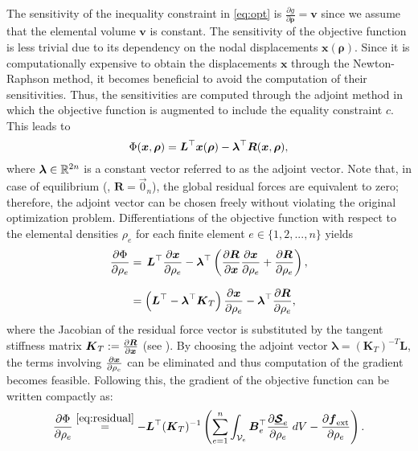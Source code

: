 The sensitivity of the inequality constraint in \eqref{eq:opt} is $\frac{\partial g}{\partial \boldsymbol{\rho}} = \boldsymbol{v}$ since we assume that the elemental volume $\boldsymbol{v}$ is constant. The sensitivity of the objective function is less trivial due to its dependency on the nodal displacements $\boldsymbol{x}(\boldsymbol{\rho})$. Since it is computationally expensive to obtain the displacements $\boldsymbol{x}$ through the Newton-Raphson method, it becomes beneficial to avoid the computation of their sensitivities. Thus, the sensitivities are computed through the adjoint method in which the objective function is augmented to include the equality constraint $c$. This leads to
%
\begin{equation}
{\Phi}({\boldsymbol{x}},\boldsymbol{\rho}) = \boldsymbol{L}^\top \boldsymbol{x}(\boldsymbol{\rho}) - \boldsymbol{\lambda}^\top \boldsymbol{R}({\boldsymbol{x}},\boldsymbol{\rho}),
\end{equation}
%
where $\boldsymbol{\lambda} \in \mathbb{R}^{2n}$ is a constant vector referred to as the adjoint vector. Note that, in case of equilibrium (\ie, $\boldsymbol{R} = \vec{0}_n$), the global residual forces are equivalent to zero; therefore, the adjoint vector can be chosen freely without violating the original optimization problem. 
Differentiations of the objective function with respect to the elemental densities $\rho_e$ for each finite element $e \in \{1,2,...,n\}$ yields
%
\begin{align}
\frac{\partial \Phi}{\partial {\rho_e}} & = \,\boldsymbol{L}^\top \frac{\partial {\boldsymbol{x}}}{\partial \rho_e} - \boldsymbol{\lambda}^\top\left(\frac{\partial \boldsymbol{R}}{ \partial {\boldsymbol{x}}} \frac{\partial {\boldsymbol{x}}}{\partial \rho_e} + \frac{\partial \boldsymbol{R}}{ \partial \rho_e} \right), \notag \\[0.75em]
 & = \left(\boldsymbol{L}^\top - \boldsymbol{\lambda}^\top \boldsymbol{K}_T \right) \frac{\partial \boldsymbol{x}}{\partial \rho_e} - \boldsymbol{\lambda}^\top \frac{\partial \boldsymbol{R}}{\partial \rho_e},  \label{eq:sen_deriv} 
\end{align}
%
\noindent where the Jacobian of the residual force vector is substituted by the tangent stiffness matrix ${\boldsymbol{K}}_T:=\tfrac{\partial {\boldsymbol{R}}}{\partial {\boldsymbol{x}}}$ (see \cite{Kim2018}). By choosing the adjoint vector $\boldsymbol{\lambda} = (\boldsymbol{K}_T)^{-T}\boldsymbol{L}$, the terms involving $\tfrac{\partial {\boldsymbol{x}}}{\partial \rho_e}$ can be eliminated and thus computation of the gradient becomes feasible. Following this, the gradient of the objective function can be written compactly as:
%
\begin{align}
\frac{\partial {\Phi} }{\partial \rho_e} \overset{\eqref{eq:residual}}{=} -\boldsymbol{L}^\top(\boldsymbol{K}_T)^{-1} \left( \sum_{e=1}^{n} \int_{\mathcal{V}_e} \boldsymbol{B}_e^\top \frac{\partial \underline{{\boldsymbol{\mathcal{S}}}}_e}{\partial {\rho_e}} \; dV - \frac{ \partial {\boldsymbol{f}}_{\textrm{ext}}}{\partial {\rho_e}}  \right). \label{eq:sens_f}
\end{align} 
%

